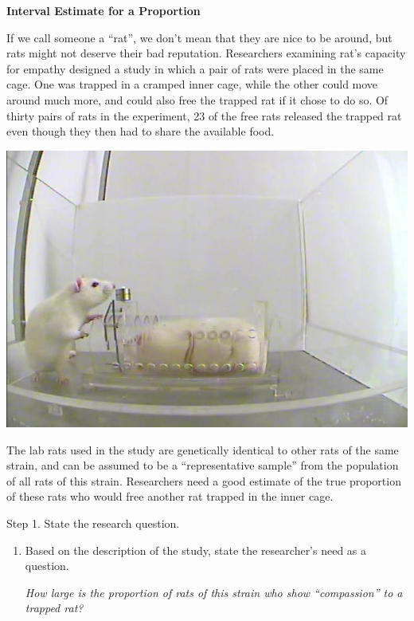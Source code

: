 
\def\theTopic{Interval Estimate }
\def\dayNum{6}

\begin{center}
\vspace*{-.2in}
{\bf {\large Interval Estimate for a Proportion}}\\
\end{center}


If we call someone a ``rat'', we don't mean that they are nice to be
around, but rats might not deserve their bad reputation. Researchers
examining rat's capacity for empathy designed a study in which a pair
of rats were placed in the same cage.  One was trapped in a cramped
inner cage, while the other could move around much more, and could
also free the trapped rat if it chose to do so.  Of thirty pairs of
rats in the experiment, 23 of the free rats released the trapped
rat even though they then had to share the available food.

\begin{center}
  \includegraphics[width=.4\linewidth]{plots/trappedRat.png}
\end{center}

The lab rats  used in the study are genetically identical to other
rats of the same strain, and can be assumed to be a ``representative
sample'' from the population of all rats of this strain.  Researchers
need a good estimate of the true proportion of these rats who would
free another rat trapped in the inner cage.

{\sf Step 1. State the research question.}\vspace{-.1in}
\begin{enumerate}
  \item Based on the description of the study, state the researcher's
   need as a question. 
\begin{students}
  \vspace{1cm}
\end{students}

\begin{key}
{\it How large is the proportion of rats of this strain who show
  ``compassion'' to a trapped rat?}
\end{key}

\end{enumerate}


